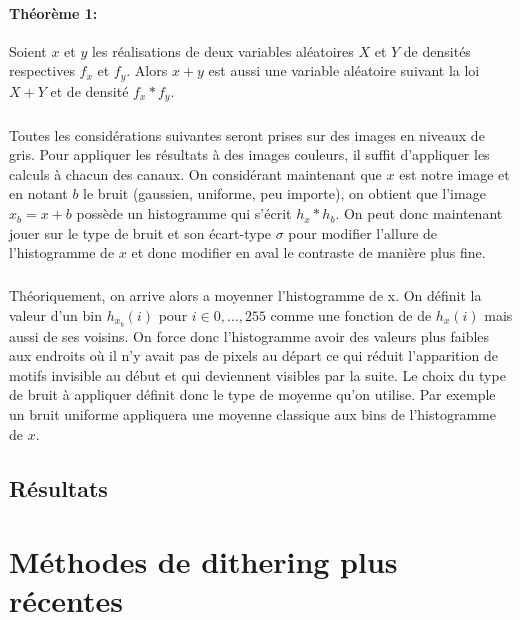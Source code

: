 \documentclass{article}
\begin{document}
\paragraph*{Théorème 1:} Soient $x$ et $y$ les réalisations de deux variables aléatoires $X$ et $Y$ de densités respectives $f_x$ et $f_y$. Alors $x+y$ est aussi une variable aléatoire suivant la loi $X+Y$ et de densité $f_x * f_y$.
\subparagraph{} Toutes les considérations suivantes seront prises sur des images en niveaux de gris. Pour appliquer les résultats à des images couleurs, il suffit d'appliquer les calculs à chacun des canaux. On considérant maintenant que $x$ est notre image et en notant $b$ le bruit (gaussien, uniforme, peu importe), on obtient que l'image $x_b = x+b$ possède un histogramme qui s'écrit $h_x * h_b$. On peut donc maintenant jouer sur le type de bruit et son écart-type $\sigma$ pour modifier l'allure de l'histogramme  de $x$ et donc modifier en aval le contraste de manière plus fine.
\subparagraph*{} Théoriquement, on arrive alors a moyenner l'histogramme de x. On définit la valeur d'un bin $h_{x_b}(i)$ pour $i \in {0,...,255}$ comme une fonction de de $h_x(i)$ mais aussi de ses voisins. On force donc l'histogramme avoir des valeurs plus faibles aux endroits où il n'y avait pas de pixels au départ ce qui réduit l'apparition de motifs invisible au début et qui deviennent visibles par la suite. Le choix du type de bruit à appliquer définit donc le type de moyenne qu'on utilise. Par exemple un bruit uniforme appliquera une moyenne classique aux bins de l'histogramme de $x$.

\subsection*{Résultats}

\section*{Méthodes de dithering plus récentes}
\end{document}

